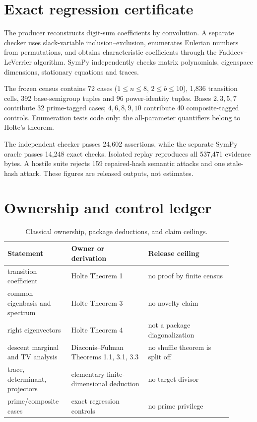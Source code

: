 \documentclass[9pt]{extarticle}
\begin{document}
\section{Exact regression certificate}
The producer reconstructs digit-sum coefficients by convolution.  A separate
checker uses slack-variable inclusion--exclusion, enumerates Eulerian numbers
from permutations, and obtains characteristic coefficients through the
Faddeev--LeVerrier algorithm.  SymPy independently checks matrix polynomials,
eigenspace dimensions, stationary equations and traces.

The frozen census contains 72 cases ($1\le n\le8$, $2\le b\le10$), 1,836
transition cells, 392 base-semigroup tuples and 96 power-identity tuples.
Bases $2,3,5,7$ contribute 32 prime-tagged cases; $4,6,8,9,10$ contribute 40
composite-tagged controls.  Enumeration tests code only: the all-parameter
quantifiers belong to Holte's theorem.

The independent checker passes 24,602 assertions, while the separate SymPy
oracle passes 14,248 exact checks.  Isolated replay reproduces all 537,471
evidence bytes.  A hostile suite rejects 159 repaired-hash semantic attacks and
one stale-hash attack.  These figures are released outputs, not estimates.

\section{Ownership and control ledger}
\begin{table}[ht]
\centering\small
\begin{tabular}{@{}p{0.25\linewidth}p{0.31\linewidth}p{0.34\linewidth}@{}}
\toprule
Statement & Owner or derivation & Release ceiling \\
\midrule
transition coefficient & Holte Theorem 1 & no proof by finite census \\
common eigenbasis and spectrum & Holte Theorem 3 & no novelty claim \\
right eigenvectors & Holte Theorem 4 & not a package diagonalization \\
descent marginal and TV analysis & Diaconis--Fulman Theorems 1.1, 3.1, 3.3 & no shuffle theorem is split off \\
trace, determinant, projectors & elementary finite-dimensional deduction & no target divisor \\
prime/composite cases & exact regression controls & no prime privilege \\
\bottomrule
\end{tabular}
\caption{Classical ownership, package deductions, and claim ceilings.}
\end{table}
\end{document}
